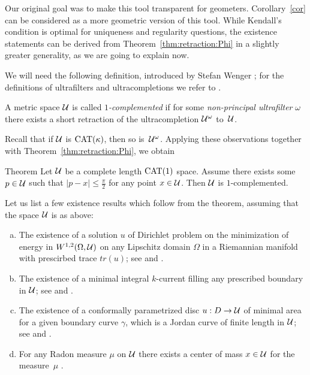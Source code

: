 \documentclass[oneside,a4paper, 12pt]{article}
\begin{document}
Our original goal was to make this tool transparent for geometers.
Corollary~\ref{cor} can be considered as a more geometric version of this tool.
While Kendall's condition is optimal for uniqueness and regularity questions, the existence statements can be derived from Theorem~\ref{thm:retraction:Phi} in a
slightly greater generality, as  we are going to explain now.

We will need the following definition, introduced by Stefan Wenger \cite{Wenger-1comp};
for the definitions of ultrafilters and ultracompletions we refer to \cite{Wenger-1comp,guo-wenger,akp}.

A metric space ${\mathcal{U}}$ is called \emph{$1$-complemented} if for some \emph{non-principal ultrafilter} $\omega$  there exists a short retraction of the ultracompletion ${\mathcal{U}}^{\omega}$ to~${\mathcal{U}}$.

Recall that if ${\mathcal{U}}$ is $\mathrm{CAT}(\kappa)$, then so is~${\mathcal{U}}^\omega$. 
Applying these observations together with Theorem~\ref{thm:retraction:Phi}, we obtain

\begin{thm}{Theorem}\label{thm:complemented}
Let ${\mathcal{U}}$ be a complete length $\mathrm{CAT}(1)$ space.
Assume  there exists some $p\in {\mathcal{U}}$ such that $|p-x|\le \tfrac\pi2$ for any point $x\in {\mathcal{U}}$.
Then ${\mathcal{U}}$ is $1$-complemented.
\end{thm}

Let us list a few existence results which follow from the theorem, assuming that the space ${\mathcal{U}}$ is as above:
\begin{enumerate}[(a)]
\item\label{dirichlet}   The existence of a solution $u$ of Dirichlet problem on the minimization of energy 
in $W^{1,2} (\Omega, {\mathcal{U}})$ on any Lipschitz domain $\Omega$ in a Riemannian manifold with prescirbed trace $tr(u)$; see \cite{KS} and \cite[Theorem 1.4]{guo-wenger}.
\item The existence of a minimal integral $k$-current filling any prescribed boundary in ${\mathcal{U}}$; 
see \cite{Ambrosio} and \cite[Theorem 3.3]{Wenger-1comp}.
\item   The existence of a conformally parametrized disc $u:D\to {\mathcal{U}}$ of minimal area for a given boundary curve $\gamma$, which is a Jordan curve of finite length in ${\mathcal{U}}$;
see \cite{LWplateau} and \cite[Theorem 1.2]{guo-wenger}.
\item\label{center} For any Radon measure $\mu$ on ${\mathcal{U}}$ there exists a center of mass $x\in {\mathcal{U}}$ for the measure~$\mu$ \cite{Sturm, yokota}.
\end{enumerate}
\end{document}
